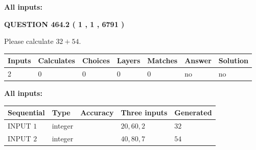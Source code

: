 \documentclass[12pt]{article}
\begin{document}
   
   
   
\noindent{}
   
   
   
   
\noindent\vspace{0.1in}\hspace{-0.08in} {\textbf{\Large{All inputs: }}}
   
   
  
\vspace{0.2in}
  
{\textbf{\Large{QUESTION
464.2 
 ( 1 , 1 , 6791 )
}}}
  
  
 
Please calculate $ %
32 +  %
54 $.
 
 
   
   
   
   
\noindent\begin{tabular}{|l|l|l|l|l|l|l|}
 \hline
Inputs & Calculates & Choices & Layers & Matches & Answer & Solution \\ \hline
 2  & 
 0  & 
 0
  & 
 0  & 
 0  & 
  no & 
  no 
  \\ \hline
 \end{tabular}
   
   
   
   
\noindent{}
   
   
   
   
\noindent\vspace{0.1in}\hspace{-0.08in} {\textbf{\Large{All inputs: }}}
   
   
  
  
\noindent\begin{tabular}{|l|l|l|l|l|}
\hline
 Sequential & Type & Accuracy & Three inputs & Generated \\ 
\hline
 
 
  INPUT $  1 $ & integer &  & $
 20
 , 
 60
 , 
 2
 $ & $ 32 $ 
 \\  \hline  
 
 
  INPUT $  2 $ & integer &  & $
 40
 , 
 80
 , 
 7
 $ & $ 54 $ 
 \\  \hline  
 \end{tabular}
   
   
   
   
   
   
 \vspace{0.2in}
 
\end{document}
